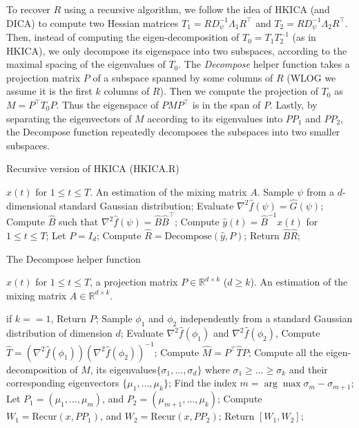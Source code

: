 \documentclass[twoside,11pt]{article}
\newcommand{\real}{\mathbb{R}}
\newcommand{\R}{\real}
\begin{document}
To recover $R$ using a recursive algorithm, we follow the idea of HKICA (and DICA) to compute two Hessian matrices $T_1 = RD_{\psi}^{-1}\Lambda_1R^{\top}$ and $T_2 = RD_{\psi}^{-1}\Lambda_2R^{\top}$. 
Then, instead of computing the eigen-decomposition of $T_0=T_1 T_2^{-1}$ (as in HKICA), we only decompose its eigenspace into two subspaces, according to the maximal spacing of the eigenvalues of $T_0$. The \emph{Decompose} helper function takes a projection matrix $P$ of a subspace spanned
by some columns of $R$ (WLOG we assume it is the first $k$ columns of $R$). Then we compute the projection of $T_0$ as $M = P^{\top}T_0P$. Thus the eigenspace of $PMP^{\top}$ is in the span of $P$. 
Lastly, by separating the eigenvectors of $M$ according to its eigenvalues into $PP_1$ and $PP_2$, the Decompose function repeatedly decomposes the subspaces into two smaller subspaces.  

\begin{algorithm} 
\caption{Recursive version of HKICA (HKICA.R)}
\label{alg:HKICA_recur}
\begin{algorithmic}[1]
\INPUT $x(t)$ for $1\le t \le T$. 
\OUTPUT An estimation of the mixing matrix $A$. 
\STATE Sample $\psi$ from a $d$-dimensional standard Gaussian distribution;
\STATE Evaluate $\nabla^2\hat{f}(\psi) = \hat{G}(\psi)$; \\
\STATE Compute $\hat{B}$ such that $\nabla^2\hat{f}(\psi) = \hat{B}\hat{B}^{\top}$;
\STATE Compute $\hat{y}(t) = \hat{B}^{-1}x(t)$ for $1\le t \le T$;
\STATE Let $P = I_d$;
\STATE Compute $\hat{R} = \text{Decompose}(\hat{y}, P)$;
\STATE Return $\hat{B}\hat{R}$;
\end{algorithmic}
\end{algorithm}
\begin{algorithm} 
\caption{The Decompose helper function}
\label{alg:recur}
\begin{algorithmic}[1]
\INPUT $x(t)$ for $1\le t \le T$, a projection matrix $P\in \R^{d\times k}$ ($d\ge k$). 
\OUTPUT An estimation of the mixing matrix $A\in \R^{d\times k}$. 

\STATE if $k==1$, Return $P$;
\STATE Sample $\phi_1$ and $\phi_2$ independently from a standard Gaussian distribution of dimension $d$;
\STATE Evaluate $\nabla^2\hat{f}(\phi_1)$ and $\nabla^2\hat{f}(\phi_2)$, 
\STATE Compute $\hat{T} = (\nabla^2 \hat{f}(\phi_1))(\nabla^2\hat{f}(\phi_2))^{-1}$;
\STATE Compute $\hat{M} = P^{\top} \hat{T} P$;
\STATE Compute all the eigen-decomposition of $\hat{M}$, its eigenvalues$\{\sigma_1,\ldots,\sigma_d\}$ where $\sigma_1\ge\ldots\ge \sigma_k$ and their corresponding eigenvectors $\{\mu_1,\ldots, \mu_k\}$;
\STATE Find the index $m = \arg\max \sigma_m - \sigma_{m+1}$; 
\STATE Let $P_1 = (\mu_1,\ldots,\mu_m)$, and $P_2 = (\mu_{m+1},\ldots,\mu_k)$;
\STATE Compute $W_1 = \text{Recur} (x, PP_1)$, and  $W_2 = \text{Recur} (x, PP_2)$;
\STATE Return $[W_1,W_2]$;
\end{algorithmic}
\end{algorithm}
\end{document}
